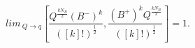 \begin{equation}
lim\, _{Q\rightarrow
q}[\frac{Q^{\frac{kN_B}2}(B^{-})^k}{([k]!)^{\frac
12}},\frac{(B^{+})^kQ^{\frac{kN_B}2}}{([k]!)^{\frac 12}}]=1.
\end{equation}

